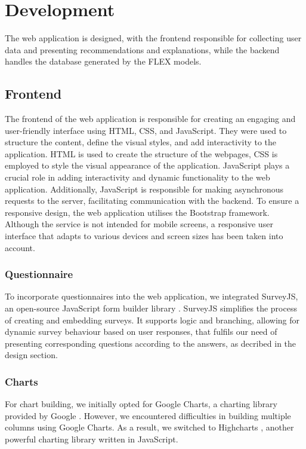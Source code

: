 \chapter{Development} 

The web application is designed, 
with the frontend responsible for collecting user data and presenting recommendations and explanations, 
while the backend handles the database generated by the FLEX models. 


\section{Frontend}

The frontend of the web application is responsible for creating an engaging and user-friendly interface using HTML, CSS, and JavaScript. 
They were used to structure the content, define the visual styles, and add interactivity to the application.
HTML is used to create the structure of the webpages, CSS is employed to style the visual appearance of the application. 
JavaScript plays a crucial role in adding interactivity and dynamic functionality to the web application. 
Additionally, JavaScript is responsible for making asynchronous requests to the server, facilitating communication with the backend.
To ensure a responsive design, the web application utilises the Bootstrap framework. 
Although the service is not intended for mobile screens, a responsive user interface that adapts to various devices and screen sizes has been taken into account. 


\subsection{Questionnaire}

To incorporate questionnaires into the web application, we integrated SurveyJS, an open-source JavaScript form builder library \cite{surveyjs}. 
SurveyJS simplifies the process of creating and embedding surveys.
It supports logic and branching, allowing for dynamic survey behaviour based on user responses, 
that fulfils our need of presenting corresponding questions according to the answers, as decribed in the design section. 


\subsection{Charts}

For chart building, we initially opted for Google Charts, a charting library provided by Google \cite{googlecharts}. 
However, we encountered difficulties in building multiple columns using Google Charts. 
As a result, we switched to Highcharts \cite{highcharts}, another powerful charting library written in JavaScript. 


